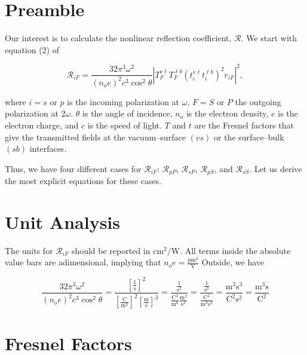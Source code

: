 \documentclass[letterpaper]{article}
\begin{document}
\section{Preamble}
Our interest is to calculate the nonlinear reflection coefficient, 
$\mathcal{R}$. We start with equation (2) of \cite{mejiaPRB02}

\begin{equation}
\mathcal{R}_{iF} = 
\frac{32\pi^{3}\omega^{2}}{(n_{o}e)^{2}c^{3}\cos^{2}\theta}
\left\vert T^{v\ell }_{F}T^{\ell b}_{F}(t^{v\ell }_{i}t^{\ell b}_{i})^{2}r_{iF}\right\vert^{2},
\end{equation}

where $i=s$ or $p$ is the incoming polarization at $\omega$, $F=S$ or $P$ the 
outgoing polarization at $2\omega$. $\theta$ is the angle of incidence, 
$n_{o}$ is the electron density, $e$ is the electron charge, and $c$ is the 
speed of light. $T$ and $t$ are the Fresnel factors that give the transmitted 
fields at the vacuum--surface $(vs)$ or the surface--bulk $(sb)$ interfaces. 

Thus, we have four different cases for $\mathcal{R}_{iF}$: $\mathcal{R}_{pP}$, 
$\mathcal{R}_{sP}$, $\mathcal{R}_{pS}$, and $\mathcal{R}_{sS}$. Let us derive 
the most explicit equations for these cases.

\section{Unit Analysis}

The units for $\mathcal{R}_{iF}$ should be reported in 
$\text{cm}^{2}/\text{W}$\cite{mejiaPRB02}. All terms inside the absolute value 
bars are adimensional, implying that 
$n_{o}e = \frac{\text{pm}^{2}}{\text{V}}$ Outside, we have

\begin{equation*}
\frac{32\pi^{3}\omega^{2}}{(n_{o}e)^{2}c^{3}\cos^{2}\theta} = 
\frac{[\frac{1}{\text{s}}]^{2}}{[\frac{\text{C}}{\text{m}^{3}}]^{2}[\frac{\text{m}}{\text{s}}]^{3}} = 
\frac{\frac{1}{\text{s}^{2}}}{\frac{\text{C}^{2}}{\text{m}^{6}}\frac{\text{m}^{3}}{\text{s}^{3}}} = 
\frac{\frac{1}{\text{s}^{2}}}{\frac{\text{C}^{2}}{\text{m}^{3}\text{s}^{3}}} = 
\frac{\text{m}^{3}\text{s}^{3}}{\text{C}^{2}\text{s}^{2}} = 
\frac{\text{m}^{3}\text{s}}{\text{C}^{2}} 
\end{equation*}

\section{Fresnel Factors}
\end{document}
